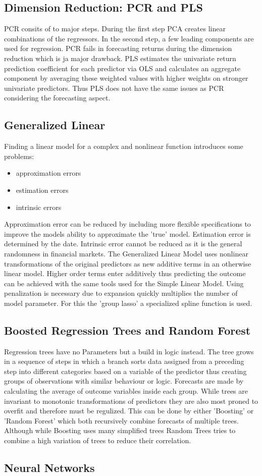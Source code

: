 \documentclass{article}
\begin{document}
\subsection{Dimension Reduction: PCR and PLS}
	PCR consits of to major steps. During the first step PCA creates linear combinations
	of the regressors. In the second step, a few leading components are used for regression.
	PCR fails in forecasting returns during the dimension reduction which is ja major drawback.
	\newline
	PLS estimates the univariate return prediction coefficient for each predictor via OLS
	and calculates an aggregate component by averaging these weighted values
	with higher weights on stronger univariate predictors. Thus PLS does not have the
	same issues as PCR considering the forecasting aspect.

\subsection{Generalized Linear}
	Finding a linear model for a complex and nonlinear function introduces some problems:
	\begin{itemize}
		\item approximation errors
		\item estimation errors
		\item intrinsic errors
	\end{itemize}
	Approximation error can be reduced by including more flexible specifications to improve the
	models ability to approximate the 'true' model.
	Estimation error is determined by the date.
	Intrinsic error cannot be reduced as it is the general randomness in financial markets.
	The Generalized Linear Model uses nonlinear transformations of the original predictors as new
	additive terms in an otherwise linear model.
	Higher order terms enter additively thus predicting the outcome can be achieved with the same
	tools used for the Simple Linear Model.
	Using penalization is necessary due to expansion quickly multiplies the number of model parameter.
	For this the 'group lasso' a specialized spline function is used.

\subsection{Boosted Regression Trees and Random Forest}
	Regression trees have no Parameters but a build in logic instead.
	The tree grows in a sequence of steps in which a branch sorts data assigned from
	a preceding step into different categories based on a variable of the predictor
	thus creating groups of observations with similar behaviour or logic.
	Forecasts are made by calculating the average of outcome variables inside each group.
	While trees are invariant to monotonic transformations of predictors they are
	also most proned to overfit and therefore must be regulized. This can be done
	by either 'Boosting' or 'Random Forest' which both recursively combine
	forecasts of multiple trees. Although while Boosting uses many simplified trees
	Random Trees tries to combine a high variation of trees to reduce their correlation.

\subsection{Neural Networks}
	
\end{document}
